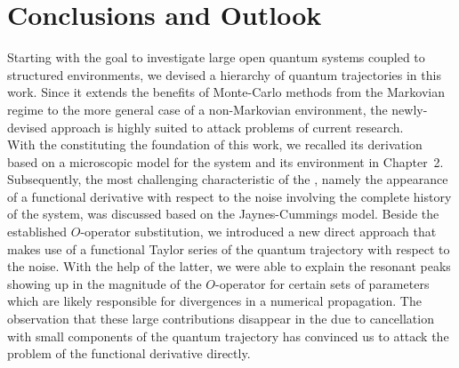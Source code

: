\chapter{Conclusions and Outlook}
\label{cha:conclusions}


Starting with the goal to investigate large open quantum systems coupled to structured environments, we devised a hierarchy of quantum trajectories in this work.
Since it extends the benefits of Monte-Carlo methods from the Markovian regime to the more general case of a non-Markovian environment, the newly-devised approach is highly suited to attack problems of current research.\\


With the \NMSSE constituting the foundation of this work, we recalled its derivation based on a microscopic model for the system and its environment in Chapter~2.
Subsequently, the most challenging characteristic of the \NMSSE, namely the appearance of a functional derivative with respect to the noise involving the complete history of the system, was discussed based on the Jaynes-Cummings model.
Beside the established $O$-operator substitution, we introduced a new direct approach that makes use of a functional Taylor series of the quantum trajectory with respect to the noise.
With the help of the latter, we were able to explain the resonant peaks showing up in the magnitude of the $O$-operator for certain sets of parameters which are likely responsible for divergences in a numerical propagation.
The observation that these large contributions disappear in the \NMSSE due to cancellation with small components of the quantum trajectory has convinced us to attack the problem of the functional derivative directly.

